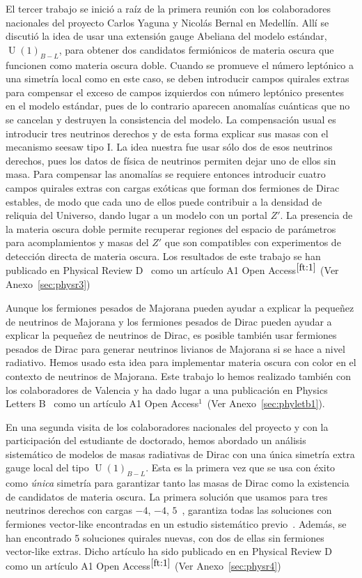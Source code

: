 El tercer trabajo se inició a raíz de la primera reunión con los colaboradores nacionales del proyecto Carlos Yaguna y Nicolás Bernal en Medellín. Allí se discutió la idea de usar una extensión gauge Abeliana del modelo estándar, $\operatorname{U}(1)_{B-L}$, para obtener dos candidatos fermiónicos de materia oscura que funcionen como materia oscura doble. Cuando se promueve el número leptónico a una simetría local como en este caso, se deben introducir campos quirales extras para compensar el exceso de campos  izquierdos con número leptónico presentes en el modelo estándar, pues de lo contrario aparecen anomalías cuánticas que no se cancelan y destruyen la consistencia del modelo. La compensación usual es introducir tres neutrinos derechos y de esta forma explicar sus masas con el mecanismo seesaw tipo I. La idea nuestra fue usar sólo dos de esos neutrinos derechos, pues los datos de física de neutrinos permiten dejar uno de ellos sin masa. Para compensar las anomalías se requiere entonces introducir cuatro campos quirales extras con cargas exóticas que forman dos fermiones de Dirac estables, de modo que cada uno de ellos puede contribuir a la densidad de reliquia del Universo,  dando lugar a un modelo con un portal $Z'$. La presencia de la materia oscura doble permite recuperar regiones del espacio de parámetros para acomplamientos y masas del $Z'$ que son compatibles con experimentos de detección directa de materia oscura. Los resultados de este trabajo se  han  publicado en Physical Review D~\cite{Bernal:2018aon} como un artículo A1 Open Access${}^{\ref{ft:1}}$ (Ver Anexo~\ref{sec:physr3})

Aunque los fermiones pesados de Majorana pueden ayudar a explicar la pequeñez de neutrinos de Majorana y los fermiones pesados de Dirac pueden ayudar a explicar la pequeñez de neutrinos de Dirac,
es posible también usar fermiones pesados de Dirac para generar neutrinos livianos de Majorana si se hace a nivel radiativo.  Hemos usado esta idea para implementar  materia oscura con color en el contexto de
neutrinos de Majorana. Este trabajo lo hemos realizado también con los colaboradores de Valencia y ha dado lugar a una publicación en Physics Letters B~\cite{Reig:2018ztc} como un artículo A1 Open Access$^1$~(Ver Anexo~\ref{sec:phyletb1}).

En una segunda visita de los colaboradores nacionales del proyecto
y con la participación del estudiante de doctorado, hemos abordado un análisis sistemático de modelos de masas radiativas de Dirac con una única simetría extra gauge local del tipo $\operatorname{U}(1)_{B-L}$. Esta es la primera vez que se usa con éxito como \emph{única} simetría  para garantizar tanto las masas de Dirac como la existencia de candidatos de materia oscura. La primera solución que usamos para tres neutrinos derechos con cargas $-4$, $-4$, $5$~\cite{Ma:2014qra}, garantiza todas las soluciones con fermiones vector-like encontradas en un estudio sistemático previo~\cite{Yao:2018ekp}. Además, se han encontrado 5 soluciones quirales nuevas, con dos de ellas sin fermiones vector-like extras.  Dicho artículo ha sido publicado en en Physical Review D~\cite{Calle:2018ovc} como un artículo A1 Open Access${}^{\ref{ft:1}}$ (Ver Anexo~\ref{sec:physr4})

